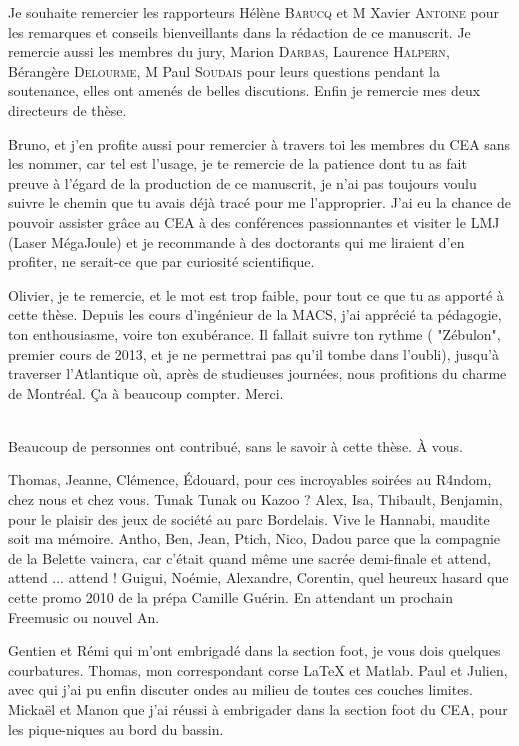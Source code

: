 
Je souhaite remercier les rapporteurs \mme{} Hélène \textsc{Barucq} et M{} Xavier \textsc{Antoine} pour les remarques et conseils bienveillants dans la rédaction de ce manuscrit.
Je remercie aussi les membres du jury, \mme{} Marion \textsc{Darbas}, \mme{} Laurence \textsc{Halpern}, \mme{} Bérangère \textsc{Delourme}, M{} Paul \textsc{Soudais} pour leurs questions pendant la soutenance, elles ont amenés de belles discutions.
Enfin je remercie mes deux directeurs de thèse.

Bruno, et j'en profite aussi pour remercier à travers toi les membres du CEA sans les nommer, car tel est l'usage, je te remercie de la patience dont tu as fait preuve à l'égard de la production de ce manuscrit, je n'ai pas toujours voulu suivre le chemin que tu avais déjà tracé pour me l'approprier.
J'ai eu la chance de pouvoir assister grâce au CEA à des conférences passionnantes et visiter le LMJ (Laser MégaJoule) et je recommande à des doctorants qui me liraient d'en profiter, ne serait-ce que par curiosité scientifique.

Olivier, je te remercie, et le mot est trop faible, pour tout ce que tu as apporté à cette thèse. 
Depuis les cours d'ingénieur de la MACS, j'ai apprécié ta pédagogie, ton enthousiasme, voire ton exubérance. Il fallait suivre ton rythme ( "Zébulon", premier cours de 2013, et je ne permettrai pas qu'il tombe dans l'oubli), jusqu'à traverser l'Atlantique où, après de studieuses journées, nous profitions du charme de Montréal.
 Ça à beaucoup compter. Merci.

~{}\\

Beaucoup de personnes ont contribué, sans le savoir à cette thèse. À vous.

Thomas, Jeanne, Clémence, Édouard, pour ces incroyables soirées au R4ndom, chez nous et chez vous. Tunak Tunak ou Kazoo ? 
Alex, Isa, Thibault, Benjamin, pour le plaisir des jeux de société au parc Bordelais. Vive le Hannabi, maudite soit ma mémoire.
Antho, Ben, Jean, Ptich, Nico, Dadou parce que la compagnie de la Belette vaincra, car c'était quand même une sacrée demi-finale et attend, attend ... attend !
Guigui, Noémie, Alexandre, Corentin, quel heureux hasard que cette promo 2010 de la prépa Camille Guérin. En attendant un prochain Freemusic ou nouvel An.


Gentien et Rémi qui m'ont embrigadé dans la section foot, je vous dois quelques courbatures. Thomas, mon correspondant corse LaTeX et Matlab. Paul et Julien, avec qui j'ai pu enfin discuter ondes au milieu de toutes ces couches limites.
Mickaël et Manon que j'ai réussi à embrigader dans la section foot du CEA, pour les pique-niques au bord du bassin.

